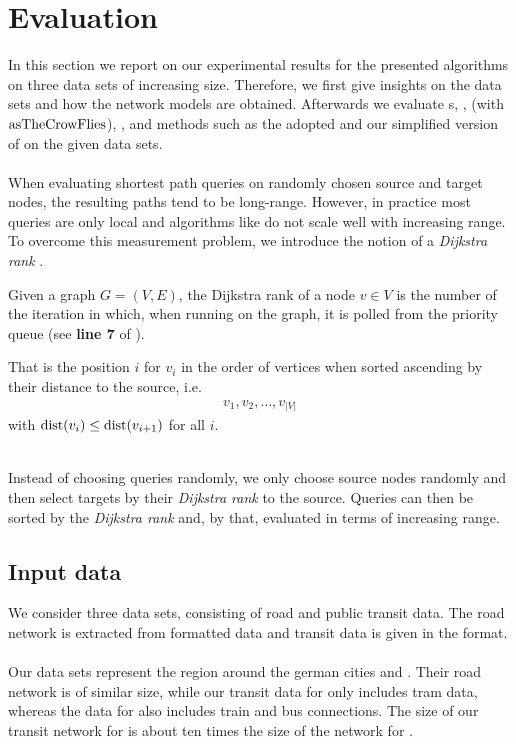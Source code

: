 \chapter{Evaluation}\label{evaluation}
	In this section we report on our experimental results for the presented algorithms on three data sets of increasing size.
	Therefore, we first give insights on the data sets and how the network models are obtained. Afterwards we evaluate
	{\coverTree}s, \dijkstra, \astar (with $\operatorname{asTheCrowFlies}$), \alt, \csa and \multiModal methods such as the adopted \dijkstra
	and our simplified version of \anr on the given data sets.\\\\
	When evaluating shortest path queries on randomly chosen source and target nodes, the resulting paths tend to be long-range.
	However, in practice most queries are only local and algorithms like \dijkstra do not scale well with increasing range.
	To overcome this measurement problem, we introduce the notion of a \textit{Dijkstra rank} .
	\begin{mydef}\label{dijkstraRank}
		Given a graph $G = (V, E)$, the \textnormal{Dijkstra rank} of a node $v \in V$ is the number of the iteration in which,
		when running \dijkstra on the graph, it is polled from the priority queue (see \textbf{line 7} of ).
		
		That is the position $i$ for $v_i$ in the order of vertices when sorted ascending by their distance to the source, i.e.
		\begin{align*}
			v_1, v_2, \ldots, v_{|V|}
		\end{align*}
		with $\operatorname{dist}(v_i) \le \operatorname{dist}(v_{i + 1})$ for all $i$.
	\end{mydef}\quad\\
	Instead of choosing queries randomly, we only choose source nodes randomly and then select targets by their
	\textit{Dijkstra rank} to the source. Queries can then be sorted by the \textit{Dijkstra rank} and, by that,
	evaluated in terms of increasing range.

\section{Input data}\label{inputData_sec}
	We consider three data sets, consisting of road and public transit data. The road network is extracted from \osm {}
	formatted data and transit data is given in the \gtfs {} format.\\\\
	Our data sets represent the region around the german cities \freiburgR and \stuttgartR. Their road network is
	of similar size, while our transit data for \freiburgR only includes tram data, whereas the data for \stuttgartR
	also includes train and bus connections. The size of our transit network for \stuttgartR is about ten times the size of
	the network for \freiburgR.
	
